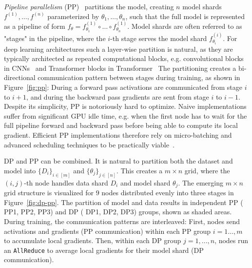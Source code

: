 \documentclass{article}
\begin{document}
\textit{Pipeline parallelism} (PP)~\cite{huang2019gpipe} partitions the model,
creating $n$ model shards $f^{(1)},\dots,f^{(n)}$ parameterized by
$\theta_1,\dots,\theta_n$, such that the full model is represented as a pipeline
of form $f_{\theta}=f^{(1)}_{\theta_1}\circ\dots\circ f^{(1)}_{\theta_n}$. Model
shards are often referred to as "stages" in the pipeline, where the $i$-th stage
serves the model shard $f^{(i)}_{\theta_i}$.  For deep learning architectures
such a layer-wise partition is natural, as they are typically architected as
repeated computational blocks, e.g. convolutional blocks in
CNNs~\cite{krizhevsky2012alexnet} and Transformer blocks in
Transformer~\cite{vaswani2017transformer} The partitioning creates a
bi-directional communication pattern between stages during training, as shown in
Figure~\ref{fig:pp}: During a forward pass activations are communicated from
stage $i$ to $i+1$, and during the backward pass gradients are sent from stage
$i$ to $i-1$. Despite its simplicity, PP is notoriously hard to optimize. Naive
implementations suffer from significant GPU idle time, e.g. when the first node
has to wait for the full pipeline forward and backward pass before being able to
compute its local gradient. Efficient PP implementations therefore rely on
micro-batching and advanced scheduling techniques to be practically
viable~\cite{harlap2018pipedream, huang2019gpipe}. 



DP and PP can be combined. It is natural to partition both the dataset and model
into $\{D_i\}_{i\in [m]}$ and $\{\theta_j\}_{j\in [n]}$. This creates a $m\times
n$ grid, where the $(i,j)$-th node handles data shard $D_i$ and model shard
$\theta_j$. The emerging $m\times n$ grid structure is visualized for $9$ nodes
distributed evenly into three stages in Figure~\ref{fig:dp-pp}. The partition of
model and data results in independent PP ({\color{oorange} PP1, PP2, PP3}) and
DP ({\color{bblue} DP1, DP2, DP3}) groups, shown as shaded areas. During
training, the communication patterns are interleaved: First, nodes send
activations and gradients (PP communication) within each PP group $i=1\dots,m$
to accumulate local gradients. Then, within each DP group $j=1,\dots,n$, nodes
run an \texttt{AllReduce} to average local gradients for their model shard (DP
communication). 
\end{document}
